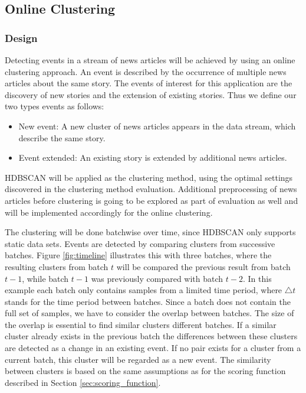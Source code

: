 \subsection{Online Clustering}

\subsubsection{Design}

Detecting events in a stream of news articles will be achieved by using an online clustering approach. An event is described by the occurrence of multiple news articles about the same story. The events of interest for this application are the discovery of new stories and the extension of existing stories. Thus we define our two types events as follows:

\begin{itemize}
    \item New event: A new cluster of news articles appears in the data stream, which describe the same story.
    \item Event extended: An existing story is extended by additional news articles.
\end{itemize}

HDBSCAN will be applied as the clustering method, using the optimal settings  discovered in the clustering method evaluation. Additional preprocessing of news articles before clustering is going to be explored as part of evaluation as well and will be implemented accordingly for the online clustering.

The clustering will be done batchwise over time, since HDBSCAN only supports static data sets. Events are detected by comparing clusters from successive batches. Figure \ref{fig:timeline} illustrates this with three batches, where the resulting clusters from batch $t$ will be compared the previous result from batch $t - 1$, while batch $t - 1$ was previously compared with batch $t - 2$. In this example each batch only contains samples from a limited time period, where $\triangle t$ stands for the time period between batches. Since a batch does not contain the full set of samples, we have to consider the overlap between batches. The size of the overlap is essential to find similar clusters different batches. If a similar cluster already exists in the previous batch the differences between these clusters are detected as a change in an existing event. If no pair exists for a cluster from a current batch, this cluster will be regarded as a new event. The similarity between clusters is based on the same assumptions as for the scoring function described in Section \ref{sec:scoring_function}.

